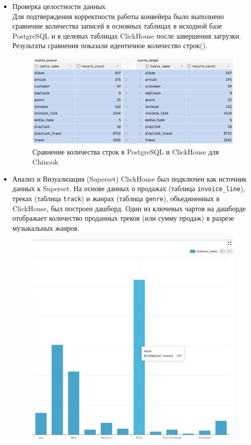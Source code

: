 \begin{enumerate}[1.]
\begin{itemize}
          \item Проверка целостности данных \\
                Для подтверждения корректности работы конвейера было выполнено сравнение количества записей в основных таблицах в исходной базе PostgreSQL и в целевых таблицах ClickHouse после завершения загрузки. Результаты сравнения показали идентичное количество строк().
                \begin{figure}[h]
                  \center
                  \includegraphics [scale=0.5] {my_folder/images/ex2_counts_comparering}
                  \caption{Сравнение количества строк в PostgreSQL и ClickHouse для Chinook}
                  \label{fig:ex2_counts_comparering}
                \end{figure}
                \FloatBarrier
          \item Анализ и Визуализация (Superset)
                ClickHouse был подключен как источник данных к Superset. На основе данных о продажах (таблица \texttt{invoice\_line}), треках (таблица \texttt{track}) и жанрах (таблица \texttt{genre}), объединенных в ClickHouse, был построен дашборд. Один из ключевых чартов на дашборде отображает количество проданных треков (или сумму продаж) в разрезе музыкальных жанров.
                \begin{figure}[h]
                  \center
                  \includegraphics [scale=0.5] {my_folder/images/ex2_superset_chart}

\end{figure}
\end{itemize}
\end{enumerate}
